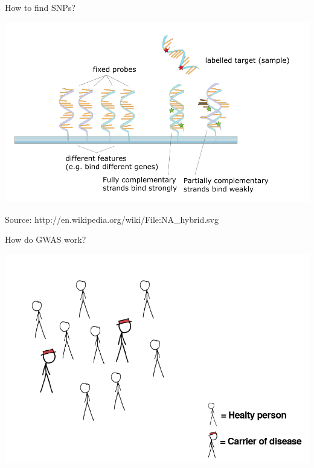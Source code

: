 \documentclass[12pt,a4paper]{beamer}
\begin{document}
\begin{frame}{How to find SNPs?}
\begin{center}
\includegraphics[scale=0.3]{microarray.png} \\
\begin{tiny}
Source: http://en.wikipedia.org/wiki/File:NA\_hybrid.svg
\end{tiny}
\end{center}
\end{frame}

\begin{frame}{How do GWAS work?}
\begin{center}
\includegraphics[scale=0.3]{distribution-disease.png} \\
\end{center}
\end{frame}
\end{document}
